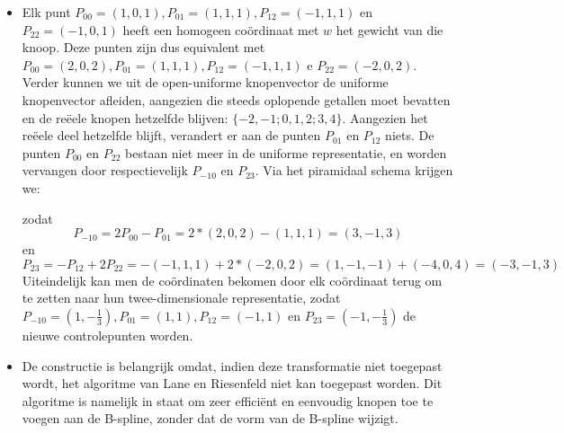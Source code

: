 \documentclass{report}
\begin{document}
\begin{enumerate}
	{
		\begin{itemize} 	
			\item Elk punt $P_{00} = (1, 0, 1), P_{01} = (1, 1, 1), P_{12} = (-1, 1, 1)$ en $P_{22} = (-1, 0, 1)$ heeft een homogeen coördinaat met $w$ het gewicht van die knoop. Deze punten zijn dus equivalent met $P_{00} = (2, 0, 2), P_{01} = (1, 1, 1), P_{12} = (-1, 1, 1)$ e $P_{22} = (-2, 0 , 2)$. Verder kunnen we uit de open-uniforme knopenvector de uniforme knopenvector afleiden, aangezien die steeds oplopende getallen moet bevatten en de reëele knopen hetzelfde blijven: $\{-2, -1; 0, 1, 2; 3, 4\}$. Aangezien het reëele deel hetzelfde blijft, verandert er aan de punten $P_{01}$ en $P_{12}$ niets. De punten $P_{00}$ en $P_{22}$ bestaan niet meer in de uniforme representatie, en worden vervangen door respectievelijk $P_{-10}$ en $P_{23}$. Via het piramidaal schema krijgen we:
			\begin{figure}[ht]
				\centering
			\end{figure}

			zodat $$P_{-10} = 2P_{00} - P_{01} = 2 * (2, 0, 2) - (1, 1, 1) = (3, -1, 3)$$ en $$P_{23} = -P_{12} + 2P_{22} = -(-1, 1, 1) + 2 * (-2, 0, 2) = (1, -1, -1) + (-4, 0, 4) = (-3, -1, 3)$$ Uiteindelijk kan men de coördinaten bekomen door elk coördinaat terug om te zetten naar hun twee-dimensionale representatie, zodat $P_{-10} = (1, -\frac{1}{3}), P_{01} = (1, 1), P_{12} = (-1, 1)$ en $P_{23} = (-1, -\frac{1}{3})$ de nieuwe controlepunten worden.

			\item De constructie is belangrijk omdat, indien deze transformatie niet toegepast wordt, het algoritme van Lane en Riesenfeld niet kan toegepast worden. Dit algoritme is namelijk in staat om zeer efficiënt en eenvoudig knopen toe te voegen aan de B-spline, zonder dat de vorm van de B-spline wijzigt. 
		\end{itemize}
	}
\end{enumerate}
\end{document}
